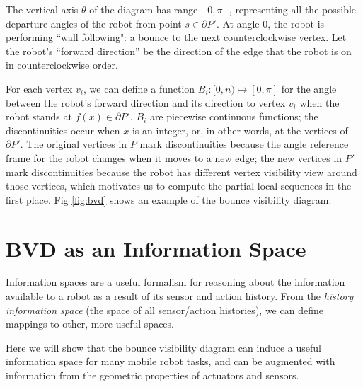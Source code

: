 \documentclass[]{styles/svproc}  %
\begin{document}
The vertical axis $\theta$ of the diagram has range $[0, \pi]$, representing all
the possible departure angles of the robot from point $s \in \partial P'$. 
At angle $0$, the robot is performing ``wall following": a bounce
to the next counterclockwise vertex.
Let the robot's ``forward direction'' be the direction of the edge that the
robot is on in counterclockwise order.

For each vertex $v_i$, we can define a function $B_i: [0, n) \mapsto [0, \pi]$
for the angle between the robot's forward direction and its direction to vertex
$v_i$ when the robot stands at $f(x)\in \partial P'$. $B_i$ are piecewise
continuous functions; the discontinuities occur when $x$ is an integer, or, in
other words, at the vertices of $\partial P'$. The original vertices in $P$ mark
discontinuities because the angle reference frame for the robot changes when it
moves to a new edge; the new vertices in $P'$ mark discontinuities because the
robot has different vertex visibility view around those vertices, which
motivates us to compute the partial local sequences in the first place.
Fig \ref{fig:bvd} shows an example of the bounce visibility diagram.

%



\section{BVD as an Information Space \label{bvd_info}}

Information spaces \cite{tovar2005information} are a useful formalism for
reasoning about the information available to a robot as a result of its sensor
and action history. From the \emph{history information space} (the space of all
sensor/action histories), we can define mappings to other, more useful spaces.

Here we will show that the bounce visibility diagram can induce a useful
information space for many mobile robot tasks, and can be augmented with
information from the geometric properties of actuators and sensors.
\end{document}
